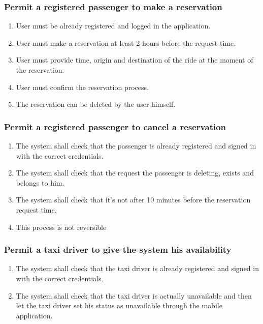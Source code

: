 		\subsubsection{Permit a registered passenger to make a reservation}
			\begin{enumerate}[label=\bfseries R\arabic*:]
				\item User must be already registered and logged in the application.
				\item User must make a reservation at least 2 hours before the request time.
				\item User must provide time, origin and destination of the ride at the moment of the reservation.
				\item User must confirm the reservation process.
				\item The reservation can be deleted by the user himself.
			\end{enumerate}
		\subsubsection{Permit a registered passenger to cancel a reservation}
			\begin{enumerate}[label=\bfseries R\arabic*:]
				\item The system shall check that the passenger is already registered and signed in with
				the correct	credentials.
				\item The system shall check that the request the passenger is deleting, exists and belongs
				to him.
				\item The system shall check that it's not after 10 minutes before the reservation request time.
				\item This process is not reversible
			\end{enumerate}
		\subsubsection{Permit a taxi driver to give the system his availability}
			\begin{enumerate}[label=\bfseries R\arabic*:]
				\item The system shall check that the taxi driver is already registered and signed in with
				the correct	credentials.
				\item The system shall check that the taxi driver is actually unavailable and then
				let the taxi driver set his status as unavailable through the mobile application.
			\end{enumerate}
